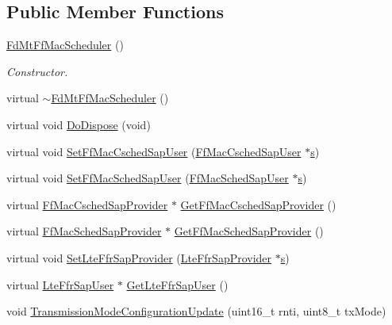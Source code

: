 \subsection*{Public Member Functions}
\begin{DoxyCompactItemize}
\item 
\hyperlink{classns3_1_1FdMtFfMacScheduler_ae0fe2883f4637340cdcc70642f838195}{Fd\+Mt\+Ff\+Mac\+Scheduler} ()
\begin{DoxyCompactList}\small\item\em Constructor. \end{DoxyCompactList}\item 
virtual \hyperlink{classns3_1_1FdMtFfMacScheduler_a11d673e0429983c36a23f1f71057ef28}{$\sim$\+Fd\+Mt\+Ff\+Mac\+Scheduler} ()
\item 
virtual void \hyperlink{classns3_1_1FdMtFfMacScheduler_a144918769ac4545031cbcd0a498cae41}{Do\+Dispose} (void)
\item 
virtual void \hyperlink{classns3_1_1FdMtFfMacScheduler_ae4fd8c5548eb2063f75dd24f5818a0f3}{Set\+Ff\+Mac\+Csched\+Sap\+User} (\hyperlink{classns3_1_1FfMacCschedSapUser}{Ff\+Mac\+Csched\+Sap\+User} $\ast$\hyperlink{generate__test__data__lte__sinr_8m_ad83eeb3a142285d1243a08c6b7026df8}{s})
\item 
virtual void \hyperlink{classns3_1_1FdMtFfMacScheduler_a89f66df83c626c0ebe91c0fbcf9064c4}{Set\+Ff\+Mac\+Sched\+Sap\+User} (\hyperlink{classns3_1_1FfMacSchedSapUser}{Ff\+Mac\+Sched\+Sap\+User} $\ast$\hyperlink{generate__test__data__lte__sinr_8m_ad83eeb3a142285d1243a08c6b7026df8}{s})
\item 
virtual \hyperlink{classns3_1_1FfMacCschedSapProvider}{Ff\+Mac\+Csched\+Sap\+Provider} $\ast$ \hyperlink{classns3_1_1FdMtFfMacScheduler_a5504211ed9952db633ac604c423cf4ba}{Get\+Ff\+Mac\+Csched\+Sap\+Provider} ()
\item 
virtual \hyperlink{classns3_1_1FfMacSchedSapProvider}{Ff\+Mac\+Sched\+Sap\+Provider} $\ast$ \hyperlink{classns3_1_1FdMtFfMacScheduler_a68623bbb7607fa7dba2933afdc6d589c}{Get\+Ff\+Mac\+Sched\+Sap\+Provider} ()
\item 
virtual void \hyperlink{classns3_1_1FdMtFfMacScheduler_af8217fbce3c8424b0930729e952e5bee}{Set\+Lte\+Ffr\+Sap\+Provider} (\hyperlink{classns3_1_1LteFfrSapProvider}{Lte\+Ffr\+Sap\+Provider} $\ast$\hyperlink{generate__test__data__lte__sinr_8m_ad83eeb3a142285d1243a08c6b7026df8}{s})
\item 
virtual \hyperlink{classns3_1_1LteFfrSapUser}{Lte\+Ffr\+Sap\+User} $\ast$ \hyperlink{classns3_1_1FdMtFfMacScheduler_a0b94ad592cc13e2dd3620f3282d023e5}{Get\+Lte\+Ffr\+Sap\+User} ()
\item 
void \hyperlink{classns3_1_1FdMtFfMacScheduler_a322c673bf7126ec4d3f25000598a5c9f}{Transmission\+Mode\+Configuration\+Update} (uint16\+\_\+t rnti, uint8\+\_\+t tx\+Mode)
\end{DoxyCompactItemize}
